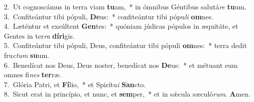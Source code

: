 {2.~}Ut cognoscámus in terra viam \textbf{tu}am,~* in ómnibus Géntibus salutá\textit{re} \textbf{tu}um.\\
{3.~}Confiteántur tibi pópuli, \textbf{De}us:~* confiteántur tibi pópu\textit{li} \textbf{om}nes.\\
{4.~}Læténtur et exsúltent \textbf{Gen}tes:~* quóniam júdicas pópulos in æquitáte, et Gentes in ter\textit{ra} \textbf{dí}\textbf{ri}gis.\\
{5.~}Confiteántur tibi pópuli, Deus, confiteántur tibi pópuli \textbf{om}nes:~* terra dedit fru\textit{ctum} \textbf{su}um.\\
{6.~}Benedícat nos Deus, Deus noster, benedícat nos \textbf{De}us:~* et métuant eum omnes fi\textit{nes} \textbf{ter}ræ.\\
{7.~}Glória Patri, et \textbf{Fí}lio,~* et Spirítu\textit{i} \textbf{San}cto.\\
{8.~}Sicut erat in princípio, et nunc, et \textbf{sem}per,~* et in sǽcula sæculó\textit{rum}. \textbf{A}men.\\
